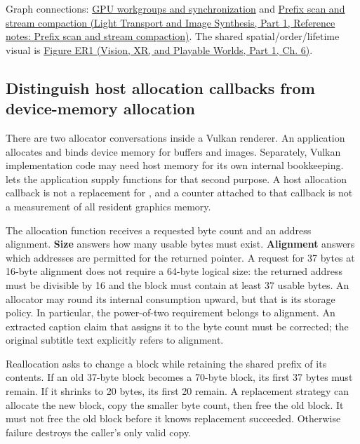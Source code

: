 Graph connections: \hyperref[appendix-f662b5b1773b]{GPU workgroups and synchronization} and \href{../04-Light-Transport-and-Image-Synthesis-P01/main.pdf\#appendix-f2ee4d086415}{Prefix scan and stream compaction (Light Transport and Image Synthesis, Part 1, Reference notes: Prefix scan and stream compaction)}. The shared spatial/order/lifetime visual is \href{../07-Vision-XR-and-Playable-Worlds-P01/main.pdf\#04-visual-computing-ii-ch037-figure-er1---footprint-compositing-order-and-storage-lifetime}{Figure ER1 (Vision, XR, and Playable Worlds, Part 1, Ch. 6)}.

\subsection{Distinguish host allocation callbacks from device-memory allocation}\label{01-foundations-i-ch016-distinguish-host-allocation-callbacks-from-device-memory-allocation}

\hypertarget{01-foundations-i-ch016-distinguish-host-allocation-callbacks-from-device-memory-allocation}{}

There are two allocator conversations inside a Vulkan renderer. An application allocates and binds device memory for buffers and images. Separately, Vulkan implementation code may need host memory for its own internal bookkeeping.  lets the application supply functions for that second purpose. A host allocation callback is not a replacement for , and a counter attached to that callback is not a measurement of all resident graphics memory.

The allocation function receives a requested byte count and an address alignment. \textbf{Size} answers how many usable bytes must exist. \textbf{Alignment} answers which addresses are permitted for the returned pointer. A request for 37 bytes at 16-byte alignment does not require a 64-byte logical size: the returned address must be divisible by 16 and the block must contain at least 37 usable bytes. An allocator may round its internal consumption upward, but that is its storage policy. In particular, the power-of-two requirement belongs to alignment. An extracted caption claim that assigns it to the byte count must be corrected; the original subtitle text explicitly refers to alignment.

Reallocation asks to change a block while retaining the shared prefix of its contents. If an old 37-byte block becomes a 70-byte block, its first 37 bytes must remain. If it shrinks to 20 bytes, its first 20 remain. A replacement strategy can allocate the new block, copy the smaller byte count, then free the old block. It must not free the old block before it knows replacement succeeded. Otherwise failure destroys the caller's only valid copy.

